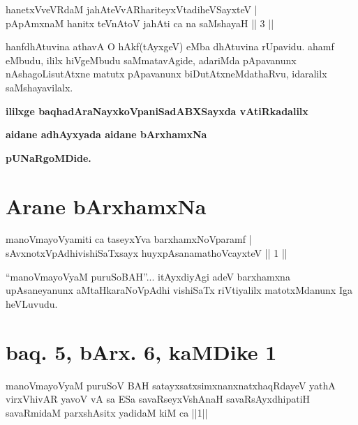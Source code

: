 
\begin{shl}
hanetxVveVRdaM jahAteVvAR\s hariteyxVtadiheVSayxteV | \\
pApAmxnaM hanitx teVnAtoV jahAti ca na saMshayaH \hfill ||  3 || 
\end{shl}

\begin{artha}
hanfdhAtuvina athavA O hAkf(tAyxgeV) eMba dhAtuvina rUpavidu. ahamf eMbudu, ililx hiVgeMbudu saMmatavAgide, adariMda pApavanunx nAshagoLisutAtxne matutx pApavanunx biDutAtxneMdathaRvu, idaralilx saMshayavilalx.
\end{artha}

\begin{center}
{\bf ililxge baqhadAraNayxkoVpaniSadABXSayxda vAtiRkadalilx}
\smallskip

{\bf aidane adhAyxyada aidane bArxhamxNa}
\smallskip

{\bf pUNaRgoMDide.}
\end{center}

\section*{Arane bArxhamxNa}

\begin{shl}
manoVmayoV\s yamiti ca taseyxYva barxhamxNoV\s paramf | \\
sAvxnotxVpAdhivishiSaTxsayx huyxpAsanamathoVcayxteV \hfill ||  1 || 
\end{shl}

\begin{artha}
``manoVmayoV\s yaM puruSoBAH''... itAyxdiyAgi adeV barxhamxna upAsaneyanunx aMtaHkaraNoVpAdhi vishiSaTx riVtiyalilx matotxMdanunx Iga heVLuvudu.
\end{artha}

\section*{baq. 5, bArx. 6, kaMDike 1}

\begin{shl}
manoVmayoV\s yaM puruSoV BAH satayxsatxsimxnanxnatxhaqRdayeV yathA virxVhivAR yavoV vA sa ESa savaRseyxVshAnaH savaRsAyxdhipatiH savaRmidaM parxshAsitx yadidaM kiM ca ||1||
\end{shl}


